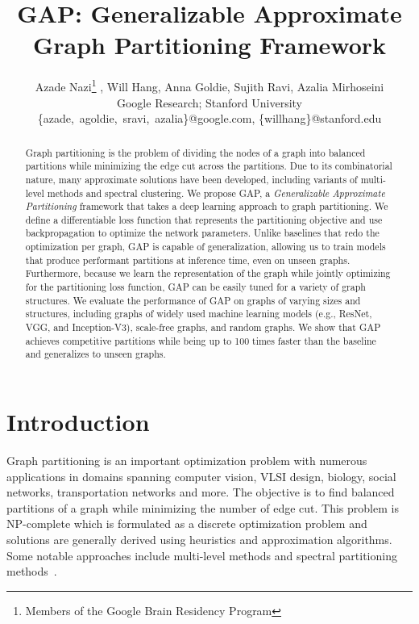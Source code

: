 \documentclass[10pt,twocolumn]{article}
\title{GAP: Generalizable Approximate Graph Partitioning Framework}
\author
{
Azade Nazi\footnote{Members of the Google Brain Residency Program} ,
Will Hang,
Anna Goldie,
Sujith Ravi, 
Azalia Mirhoseini
\\
Google Research;
Stanford University
\\
\small{\{azade,~agoldie,~sravi,~azalia\}@google.com},
\small{\{willhang\}@stanford.edu}
}
\date{}
\begin{document}
\maketitle
\begin{abstract}







Graph partitioning is the problem of dividing the nodes of a graph into balanced partitions while minimizing the edge cut across the partitions. Due to its combinatorial nature, many approximate solutions have been developed, including variants of multi-level methods and spectral clustering. We propose GAP, a {\it Generalizable Approximate Partitioning} framework that takes a deep learning approach to graph partitioning. We define a differentiable loss function that represents the partitioning objective and use backpropagation to optimize the network parameters. Unlike baselines that redo the optimization per graph, GAP is capable of generalization, allowing us to train models that produce performant partitions at inference time, even on unseen graphs. Furthermore, because we learn the representation of the graph while jointly optimizing for the partitioning loss function, GAP can be easily tuned for a variety of graph structures. We evaluate the performance of GAP on graphs of varying sizes and structures, including graphs of widely used machine learning models (e.g., ResNet, VGG, and Inception-V3), scale-free graphs, and random graphs. We show that GAP achieves competitive partitions while being up to 100 times faster than the baseline and generalizes to unseen graphs.
\end{abstract}


\section{Introduction}
\label{sec:intro}




Graph partitioning is an important optimization problem with numerous applications in domains spanning computer vision, VLSI design, biology, social networks, transportation networks and more. The objective is to find balanced partitions of a graph while minimizing the number of edge cut. This problem is NP-complete which is formulated as a discrete optimization problem and solutions are generally derived using heuristics and approximation algorithms. Some notable approaches include multi-level methods and spectral partitioning methods~\cite{karypis_1998, karypis_1999, karypis_2000, miettinen_2006, andersen2006, chung2007gp}.
\end{document}
